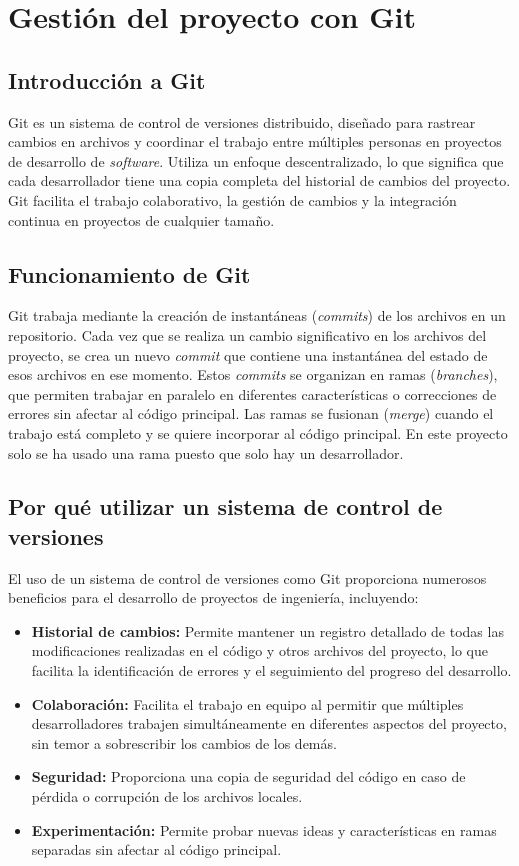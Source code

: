 \section{Gestión del proyecto con Git}
\subsection{Introducción a Git}
Git es un sistema de control de versiones distribuido, diseñado para rastrear cambios en archivos y coordinar el trabajo entre múltiples personas en proyectos de desarrollo de \textit{software}. Utiliza un enfoque descentralizado, lo que significa que cada desarrollador tiene una copia completa del historial de cambios del proyecto. Git facilita el trabajo colaborativo, la gestión de cambios y la integración continua en proyectos de cualquier tamaño.

\subsection{Funcionamiento de Git}
Git trabaja mediante la creación de instantáneas (\textit{commits}) de los archivos en un repositorio. Cada vez que se realiza un cambio significativo en los archivos del proyecto, se crea un nuevo \textit{commit} que contiene una instantánea del estado de esos archivos en ese momento. Estos \textit{commits} se organizan en ramas (\textit{branches}), que permiten trabajar en paralelo en diferentes características o correcciones de errores sin afectar al código principal. Las ramas se fusionan (\textit{merge}) cuando el trabajo está completo y se quiere incorporar al código principal. En este proyecto solo se ha usado una rama puesto que solo hay un desarrollador.

\subsection{Por qué utilizar un sistema de control de versiones}
El uso de un sistema de control de versiones como Git proporciona numerosos beneficios para el desarrollo de proyectos de ingeniería, incluyendo:

\begin{itemize}
	\item \textbf{Historial de cambios:} Permite mantener un registro detallado de todas las modificaciones realizadas en el código y otros archivos del proyecto, lo que facilita la identificación de errores y el seguimiento del progreso del desarrollo.
	\item \textbf{Colaboración:} Facilita el trabajo en equipo al permitir que múltiples desarrolladores trabajen simultáneamente en diferentes aspectos del proyecto, sin temor a sobrescribir los cambios de los demás.
	\item \textbf{Seguridad:} Proporciona una copia de seguridad del código en caso de pérdida o corrupción de los archivos locales.
	\item \textbf{Experimentación:} Permite probar nuevas ideas y características en ramas separadas sin afectar al código principal.
\end{itemize}

